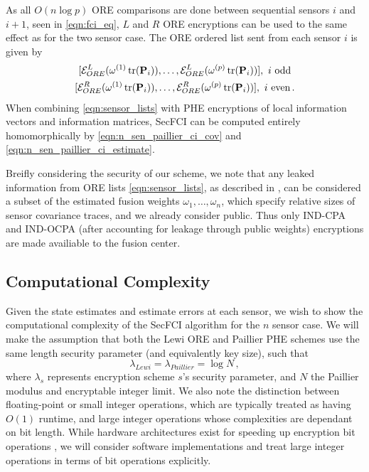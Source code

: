 \documentclass[letterpaper, 10 pt, conference]{ieeeconf}  %
\begin{document}
As all $O(n\log{p})$ ORE comparisons are done between sequential sensors $i$ and $i+1$, seen in \eqref{eqn:fci_eq}, $L$ and $R$ ORE encryptions can be used to the same effect as for the two sensor case. The ORE ordered list sent from each sensor $i$ is given by
\begin{equation}
   \begin{gathered} \label{eqn:sensor_lists}
      [\mathcal{E}^L_{ORE}(\omega^{(1)}\tr(\mP_i)),\dots,\mathcal{E}^L_{ORE}(\omega^{(p)}\tr(\mP_i))],\ i\text{ odd} \\
      [\mathcal{E}^R_{ORE}(\omega^{(1)}\tr(\mP_i)),\dots,\mathcal{E}^R_{ORE}(\omega^{(p)}\tr(\mP_i))],\ i\text{ even}\,.
   \end{gathered}
\end{equation}
When combining \eqref{eqn:sensor_lists} with PHE encryptions of local information vectors and information matrices, SecFCI can be computed entirely homomorphically by \eqref{eqn:n_sen_paillier_ci_cov} and \eqref{eqn:n_sen_paillier_ci_estimate}.

Breifly considering the security of our scheme, we note that any leaked information from ORE lists \eqref{eqn:sensor_lists}, as described in \cite{chenettePracticalOrderRevealingEncryption2016}, can be considered a subset of the estimated fusion weights $\omega_1,\dots,\omega_n$, which specify relative sizes of sensor covariance traces, and we already consider public. Thus only IND-CPA and IND-OCPA (after accounting for leakage through public weights) encryptions are made availiable to the fusion center.

\subsection{Computational Complexity} \label{subsec:complexity}
Given the state estimates and estimate errors at each sensor, we wish to show the computational complexity of the SecFCI algorithm for the $n$ sensor case. We will make the assumption that both the Lewi ORE and Paillier PHE schemes use the same length security parameter (and equivalently key size), such that
\begin{equation}
   \lambda_{Lewi} = \lambda_{Paillier} = \log{N}\,, \label{eqn:keylength}
\end{equation}
where $\lambda_{s}$ represents encryption scheme $s$'s security parameter, and $N$ the Paillier modulus and encryptable integer limit. We also note the distinction between floating-point or small integer operations, which are typically treated as having $O(1)$ runtime, and large integer operations whose complexities are dependant on bit length. While hardware architectures exist for speeding up encryption bit operations \cite{gueronIntelAdvancedEncryption2010}, we will consider software implementations and treat large integer operations in terms of bit operations explicitly.
\end{document}
